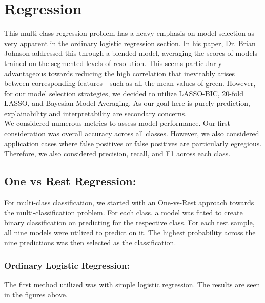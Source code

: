 \documentclass[11pt]{article}
\begin{document}
\newpage
\section{Regression}
This multi-class regression problem has a heavy emphasis on model selection as very apparent in the ordinary logistic regression section. In his paper, Dr. Brian Johnson addressed this through a blended model, averaging the scores of models trained on the segmented levels of resolution. This seems particularly advantageous towards reducing the high correlation that inevitably arises between corresponding features - such as all the mean values of green. However, for our model selection strategies, we decided to utilize LASSO-BIC, 20-fold LASSO, and Bayesian Model Averaging. As our goal here is purely prediction, explainability and interpretability are secondary concerns.\\

We considered numerous metrics to assess model performance. Our first consideration was overall accuracy across all classes. However, we also considered application cases where false positives or false positives are particularly egregious. Therefore, we also considered precision, recall, and F1 across each class.

\subsection{One vs Rest Regression:}
For multi-class classification, we started with an One-vs-Rest approach towards the multi-classification problem. For each class, a model was fitted to create binary classification on predicting for the respective class. For each test sample, all nine models were utilized to predict  on it. The highest probability across the nine predictions was then selected as the classification. 

\subsubsection{Ordinary Logistic Regression:}
The first method utilized was with simple logistic regression. The results are seen in the figures above.\\
\end{document}
